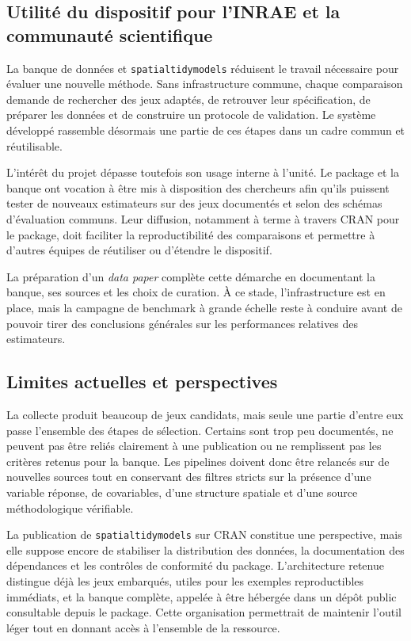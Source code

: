 \documentclass[11pt,a4paper]{article}
\begin{document}
\subsection{Utilité du dispositif pour l'INRAE et la communauté scientifique}

La banque de données et \texttt{spatialtidymodels} réduisent le travail nécessaire pour évaluer une nouvelle méthode. Sans infrastructure commune, chaque comparaison demande de rechercher des jeux adaptés, de retrouver leur spécification, de préparer les données et de construire un protocole de validation. Le système développé rassemble désormais une partie de ces étapes dans un cadre commun et réutilisable.

L'intérêt du projet dépasse toutefois son usage interne à l'unité. Le package et la banque ont vocation à être mis à disposition des chercheurs afin qu'ils puissent tester de nouveaux estimateurs sur des jeux documentés et selon des schémas d'évaluation communs. Leur diffusion, notamment à terme à travers CRAN pour le package, doit faciliter la reproductibilité des comparaisons et permettre à d'autres équipes de réutiliser ou d'étendre le dispositif.

La préparation d'un \textit{data paper} complète cette démarche en documentant la banque, ses sources et les choix de curation. À ce stade, l'infrastructure est en place, mais la campagne de benchmark à grande échelle reste à conduire avant de pouvoir tirer des conclusions générales sur les performances relatives des estimateurs.

\subsection{Limites actuelles et perspectives}

La collecte produit beaucoup de jeux candidats, mais seule une partie d'entre eux passe l'ensemble des étapes de sélection. Certains sont trop peu documentés, ne peuvent pas être reliés clairement à une publication ou ne remplissent pas les critères retenus pour la banque. Les pipelines doivent donc être relancés sur de nouvelles sources tout en conservant des filtres stricts sur la présence d'une variable réponse, de covariables, d'une structure spatiale et d'une source méthodologique vérifiable.

La publication de \texttt{spatialtidymodels} sur CRAN constitue une perspective, mais elle suppose encore de stabiliser la distribution des données, la documentation des dépendances et les contrôles de conformité du package. L'architecture retenue distingue déjà les jeux embarqués, utiles pour les exemples reproductibles immédiats, et la banque complète, appelée à être hébergée dans un dépôt public consultable depuis le package. Cette organisation permettrait de maintenir l'outil léger tout en donnant accès à l'ensemble de la ressource.
\end{document}
